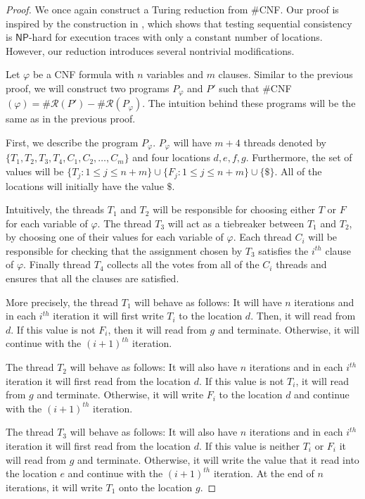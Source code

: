 \documentclass[acmsmall]{acmart}
\begin{document}
\begin{proof}
    We once again construct a Turing reduction from $\#$CNF. Our proof is inspired by the construction in 
    \cite{sharedMem}, which shows that testing sequential consistency is $\mathsf{NP}$-hard for execution traces with only a constant number of locations. However, our reduction introduces several nontrivial modifications.

    Let $\varphi$ be a CNF formula with $n$ variables
    and $m$ clauses. Similar to the previous proof, we will construct
    two programs $P_\varphi$ and $P'$ such that  $\#$CNF$(\varphi) = \#\mathcal{R}(P') - \#\mathcal{R}(P_\varphi)$. The intuition behind these programs will
    be the same as in the previous proof.

    First, we describe the program $P_\varphi$. $P_\varphi$ will have $m+4$ threads
    denoted by $\{T_1,T_2,T_3,T_4,C_1,C_2,\dots,C_m\}$ and four locations $d,e,f,g$. 
    Furthermore, the set of values will be $\{T_j : 1 \le j \le n+m\} \cup \{F_j : 1 \le j \le n+m\} \cup  \{\$\}$. All of the locations will initially have the value $\$$.
    
    Intuitively, the threads $T_1$ and $T_2$ will be responsible for choosing either $T$ or $F$ for each variable of $\varphi$. The thread $T_3$ will act as a tiebreaker between $T_1$ 
    and $T_2$, by choosing one of their values for each variable of $\varphi$.
    Each thread $C_i$ will be responsible for checking that the assignment
    chosen by $T_3$ satisfies the $i^{th}$ clause of $\varphi$.
    Finally thread $T_4$ collects all the votes from all of the $C_i$ threads and 
    ensures that all the clauses are satisfied.

    More precisely, the thread $T_1$ will behave as follows: It will have $n$ iterations
    and in each $i^{th}$ iteration it will first write $T_i$ to the location $d$. Then, it will read from $d$.
    If this value is not $F_i$, then it will read from $g$ and terminate.
    Otherwise, it will continue with the $(i+1)^{th}$ iteration.

    The thread $T_2$ will behave as follows: It will also have $n$ iterations
    and in each $i^{th}$ iteration it will first read from the location $d$.
    If this value is not $T_i$, it will read from $g$ and terminate.
    Otherwise, it will write $F_i$ to the location $d$ and continue with the $(i+1)^{th}$ iteration.

    The thread $T_3$ will behave as follows: It will also have $n$ iterations
    and in each $i^{th}$ iteration it will first read from the location $d$.
    If this value is neither $T_i$ or $F_i$ it will read from $g$ and terminate.
    Otherwise, it will write the value that it read into the location $e$
    and continue with the $(i+1)^{th}$ iteration.
    At the end of $n$ iterations, it will write $T_1$ onto the location $g$.


\end{proof}
\end{document}
